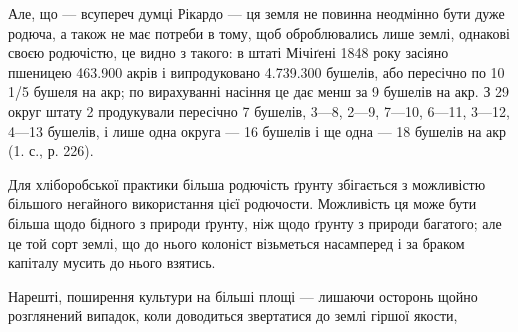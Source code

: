 Але, що — всупереч думці Рікардо — ця земля не повинна неодмінно бути
дуже родюча, а також не має потреби в тому, щоб оброблювались лише землі,
однакові своєю родючістю, це видно з такого: в штаті Мічіґені 1848 року засіяно
пшеницею 463.900 акрів і випродуковано 4.739.300 бушелів, або пересічно по
10 1/5 бушеля на акр; по вирахуванні насіння це дає менш за 9 бушелів на
акр. З 29 округ штату 2 продукували пересічно 7 бушелів, 3—8, 2—9, 7—10, 6—11, 3—12, 4—13 бушелів, і
лише одна округа — 16 бушелів і ще одна — 18 бушелів на акр (1. с., р. 226).

Для хліборобської практики більша родючість ґрунту збігається з можливістю
більшого негайного використання цієї родючости. Можливість ця може бути
більша щодо бідного з природи ґрунту, ніж щодо ґрунту з природи багатого;
але це той сорт землі, що до нього колоніст візьметься насамперед і за браком
капіталу мусить до нього взятись.

Нарешті, поширення культури на більші площі — лишаючи осторонь щойно розглянений випадок, коли
доводиться звертатися до землі гіршої якости,
\parbreak{}  %
